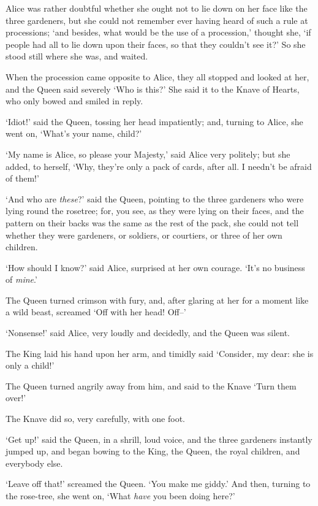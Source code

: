   Alice was rather doubtful whether she ought not to lie down on
her face like the three gardeners, but she could not remember
ever having heard of such a rule at processions; `and besides,
what would be the use of a procession,' thought she, `if people
had all to lie down upon their faces, so that they couldn't see it?'
So she stood still where she was, and waited.

  When the procession came opposite to Alice, they all stopped
and looked at her, and the Queen said severely `Who is this?'
She said it to the Knave of Hearts, who only bowed and smiled in reply.

  `Idiot!' said the Queen, tossing her head impatiently; and,
turning to Alice, she went on, `What's your name, child?'

  `My name is Alice, so please your Majesty,' said Alice very
politely; but she added, to herself, `Why, they're only a pack of
cards, after all.  I needn't be afraid of them!'

  `And who are {\it these}?' said the Queen, pointing to the three
gardeners who were lying round the rosetree; for, you see, as
they were lying on their faces, and the pattern on their backs
was the same as the rest of the pack, she could not tell whether
they were gardeners, or soldiers, or courtiers, or three of her
own children.

  `How should I know?' said Alice, surprised at her own courage.
`It's no business of {\it mine}.'

  The Queen turned crimson with fury, and, after glaring at her
for a moment like a wild beast, screamed `Off with her head!
Off--'

  `Nonsense!' said Alice, very loudly and decidedly, and the
Queen was silent.

  The King laid his hand upon her arm, and timidly said
`Consider, my dear:  she is only a child!'

  The Queen turned angrily away from him, and said to the Knave
`Turn them over!'

  The Knave did so, very carefully, with one foot.

  `Get up!' said the Queen, in a shrill, loud voice, and the
three gardeners instantly jumped up, and began bowing to the
King, the Queen, the royal children, and everybody else.

  `Leave off that!' screamed the Queen.  `You make me giddy.'
And then, turning to the rose-tree, she went on, `What {\it have} you
been doing here?'

